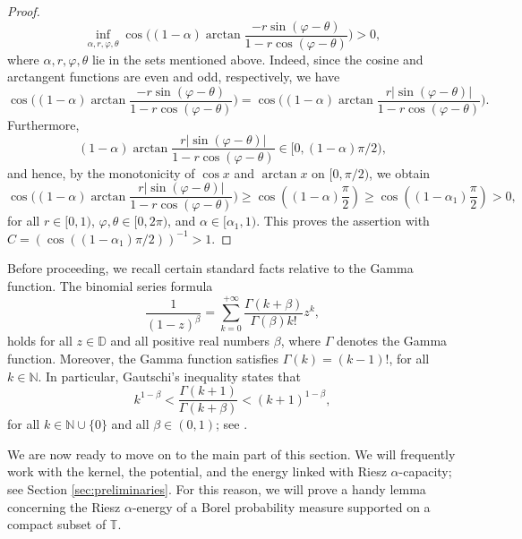 \documentclass[12pt]{amsart}
\theoremstyle{definition}\newtheorem{remark}[theorem]{Remark}
\theoremstyle{definition}\newtheorem{example}[theorem]{Example}
\theoremstyle{definition}\newtheorem{definition}{Definition}
\numberwithin{equation}{section}
\newcommand\DD{{\mathbb D}}
\newcommand\TT{{\mathbb T}}
\begin{document}
\begin{proof}
\begin{equation}
\inf_{\alpha,r, \varphi,\theta}{\cos{\Big((1-\alpha) \arctan\frac{-r\sin(\varphi-\theta)}{1-r\cos(\varphi-\theta)}\Big)}}>0,
\end{equation}
where $ \alpha,r, \varphi,\theta$ lie in the sets mentioned above. Indeed, since the cosine and arctangent functions are even and odd, respectively, we have
\begin{equation*}
\cos{\Big((1-\alpha) \arctan\frac{-r\sin(\varphi-\theta)}{1-r\cos(\varphi-\theta)}\Big)}=\cos{\Big((1-\alpha) \arctan\frac{r|\sin(\varphi-\theta)|}{1-r\cos(\varphi-\theta)}\Big)}.
\end{equation*}
Furthermore,
\begin{equation*}
    (1-\alpha)\arctan\frac{r|\sin(\varphi-\theta)|}{1-r\cos(\varphi-\theta)}\in [0,(1-\alpha)\pi/2),
\end{equation*}
and hence,  by the monotonicity of $\cos x$ and $\arctan x$ on $[0,\pi/2)$, we obtain
\begin{equation*}
\cos{\Big((1-\alpha) \arctan\frac{r|\sin(\varphi-\theta)|}{1-r\cos(\varphi-\theta)}\Big)}\geq \cos\left((1-\alpha)\frac{\pi}{2}\right)\geq \cos\left((1-\alpha_1)\frac{\pi}{2}\right)>0,
\end{equation*}
for all $r\in [0,1)$, $\varphi,\theta\in [0,2\pi)$, and $\alpha\in [\alpha_1,1)$. This proves the assertion with $C=(\cos((1-\alpha_1)\pi/2))^{-1}>1$.
\end{proof}


Before proceeding, we recall certain standard facts relative to the Gamma function. The binomial series formula
\begin{equation}\label{eq:binomial}
    \frac{1}{(1-z)^\beta}=\sum_{k=0}^{+\infty}\frac{\Gamma(k+\beta)}{\Gamma(\beta)k!}z^k,
\end{equation}
holds for all $z\in\DD$ and all positive real numbers $\beta$, where $\Gamma$ denotes the Gamma function. Moreover, the Gamma function satisfies $\Gamma(k)=(k-1)!$, for all $k\in\mathbb{N}$. In particular, Gautschi's inequality states that
\begin{equation}\label{eq:gautschi}
    k^{1-\beta}<\frac{\Gamma(k+1)}{\Gamma(k+\beta)}<(k+1)^{1-\beta},
\end{equation}
for all $k\in\mathbb{N}\cup\{0\}$ and all $\beta\in (0,1)$; see \cite[p. 79, eq. (7)]{Gautschi}.

We are now ready to move on to the main part of this section. We will frequently work with the kernel, the potential, and the energy linked with Riesz $\alpha$-capacity; see Section \ref{sec:preliminaries}. For this reason, we will prove a handy lemma concerning the Riesz $\alpha$-energy of a Borel probability measure supported on a compact subset of $\TT$. 
\end{document}
